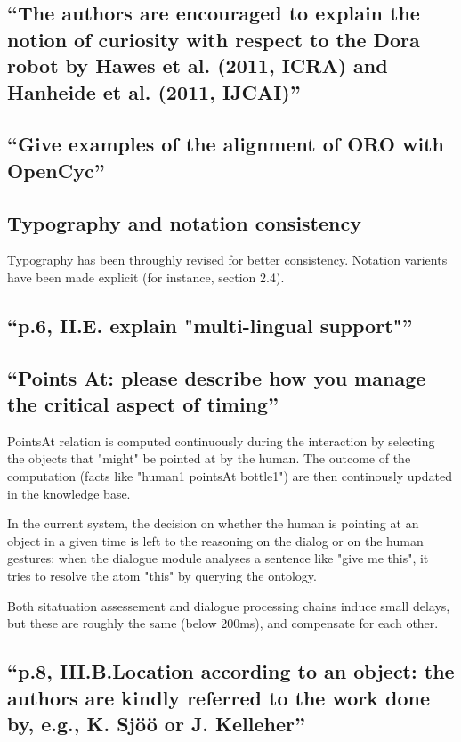 \documentclass{article}
\begin{document}
\subsection{``The authors are encouraged to explain the notion of curiosity
with respect to the Dora robot by Hawes et al. (2011, ICRA) and Hanheide et al.
(2011, IJCAI)''}

\subsection{``Give examples of the alignment of ORO with OpenCyc''}

\subsection{Typography and notation consistency}

Typography has been throughly revised for better consistency. Notation varients have been
made explicit (for instance, section 2.4).

\subsection{``p.6, II.E. explain "multi-lingual support"''}


\subsection{``Points At: please describe how you manage the critical aspect of
timing''}

PointsAt relation is computed continuously during the interaction by 
selecting the objects that "might" be pointed at by the human. The outcome
of the computation (facts like "human1 pointsAt bottle1") are then
continously updated in the knowledge base.

In the current system, the decision on whether the human is pointing at an 
object in a given time is left to the reasoning on the dialog or on the human gestures:
when the dialogue module analyses a sentence like "give me this", it tries to
resolve the atom "this" by querying the ontology.

Both sitatuation assessement and dialogue processing chains induce 
small delays, but these are roughly the same (below 200ms), and 
compensate for each other.

\subsection{``p.8, III.B.Location according to an object: the authors are
kindly referred to the work done by, e.g., K. Sjöö or J. Kelleher''}
\end{document}
